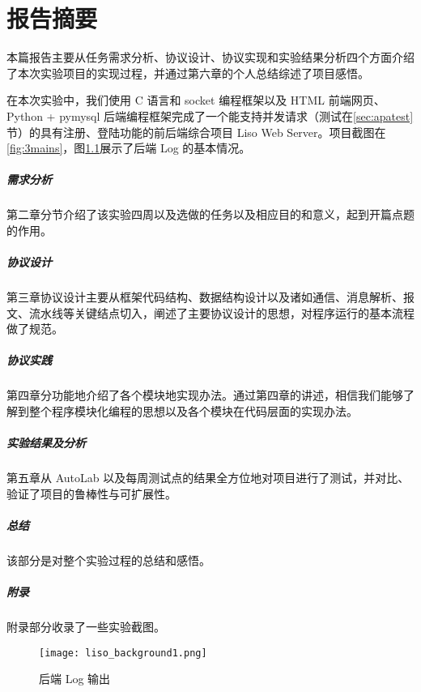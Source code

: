 \chapter{报告摘要}

本篇报告主要从任务需求分析、协议设计、协议实现和实验结果分析四个方面介绍了本次实验项目的实现过程，并通过第六章的个人总结综述了项目感悟。

在本次实验中，我们使用 C 语言和 socket 编程框架以及 HTML 前端网页、Python + pymysql 后端编程框架完成了一个能支持并发请求（测试在\ref{sec:apatest} 节）的具有注册、登陆功能的前后端综合项目 Liso Web Server。项目截图在 \ref{fig:3mains}，图\ref{fig:laptop_main}展示了后端 Log 的基本情况。

\paragraph*{需求分析} 第二章分节介绍了该实验四周以及选做的任务以及相应目的和意义，起到开篇点题的作用。

\paragraph*{协议设计} 第三章协议设计主要从框架代码结构、数据结构设计以及诸如通信、消息解析、报文、流水线等关键结点切入，阐述了主要协议设计的思想，对程序运行的基本流程做了规范。

\paragraph*{协议实践} 第四章分功能地介绍了各个模块地实现办法。通过第四章的讲述，相信我们能够了解到整个程序模块化编程的思想以及各个模块在代码层面的实现办法。

\paragraph*{实验结果及分析} 第五章从 AutoLab 以及每周测试点的结果全方位地对项目进行了测试，并对比、验证了项目的鲁棒性与可扩展性。

\paragraph*{总结}该部分是对整个实验过程的总结和感悟。

\paragraph*{附录} 附录部分收录了一些实验截图。

\begin{figure}[htbp!]
    \begin{center}
        \texttt{[image: liso\_background1.png]}
    \end{center}
    \caption{后端 Log 输出}\label{fig:laptop_main}
\end{figure}

